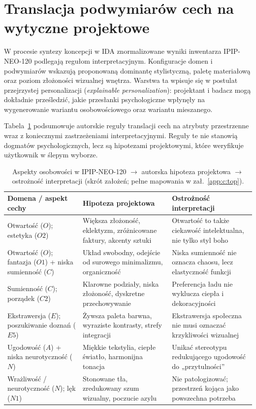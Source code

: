 \section{Translacja podwymiarów cech na wytyczne projektowe}
\label{ch05:sec:mapowanie}

W procesie syntezy koncepcji w IDA znormalizowane wyniki inwentarza IPIP-NEO-120 podlegają regułom interpretacyjnym.
Konfiguracje domen i podwymiarów wskazują proponowaną dominantę stylistyczną, paletę materiałową oraz poziom złożoności wizualnej wnętrza.
Warstwa ta wpisuje się w postulat przejrzystej personalizacji (\emph{explainable personalization}): projektant i badacz mogą dokładnie prześledzić, jakie przesłanki psychologiczne wpłynęły na wygenerowanie wariantu osobowościowego oraz wariantu mieszanego.

Tabela~\ref{tab:ch05:hipotezy} podsumowuje autorskie reguły translacji cech na atrybuty przestrzenne wraz z koniecznymi zastrzeżeniami interpretacyjnymi. Reguły te nie stanowią dogmatów psychologicznych, lecz są hipotezami projektowymi, które weryfikuje użytkownik w ślepym wyborze.

\begin{table}[htbp]
  \centering
  \caption{Aspekty osobowości w IPIP-NEO-120 $\rightarrow$ autorska hipoteza projektowa $\rightarrow$ ostrożność interpretacji (skrót założeń; pełne mapowania w zał.~\ref{app:c:top}).}
  \label{tab:ch05:hipotezy}
  \begin{tabular}{@{}p{}p{}p{}@{}}
    \toprule
    Domena / aspekt cechy & Hipoteza projektowa & Ostrożność interpretacji \\
    \midrule
    Otwartość ($O$); estetyka ($O2$)
      & Większa złożoność, eklektyzm, zróżnicowane faktury, akcenty sztuki
      & Otwartość to także ciekawość intelektualna, nie tylko styl boho \\
    \addlinespace
    Otwartość ($O$); fantazja ($O1$) + niska sumienność ($C$)
      & Układ swobodny, odejście od surowego minimalizmu, organiczność
      & Niska sumienność nie oznacza chaosu, lecz elastyczność funkcji \\
    \addlinespace
    Sumienność ($C$); porządek ($C2$)
      & Klarowne podziały, niska złożoność, dyskretne przechowywanie
      & Preferencja ładu nie wyklucza ciepła i dekoracyjności \\
    \addlinespace
    Ekstrawersja ($E$); poszukiwanie doznań ($E5$)
      & Żywsza paleta barwna, wyraziste kontrasty, strefy integracji
      & Ekstrawersja społeczna nie musi oznaczać krzykliwości wizualnej \\
    \addlinespace
    Ugodowość ($A$) + niska neurotyczność ($N$)
      & Miękkie tekstylia, ciepłe światło, harmonijna tonacja
      & Unikać stereotypu redukującego ugodowość do „przytulności” \\
    \addlinespace
    Wrażliwość / neurotyczność ($N$); lęk ($N1$)
      & Stonowane tła, zredukowany szum wizualny, poczucie azylu
      & Nie patologizować; przestrzeń kojąca jako powszechna potrzeba \\
    \bottomrule
  \end{tabular}
\end{table}

